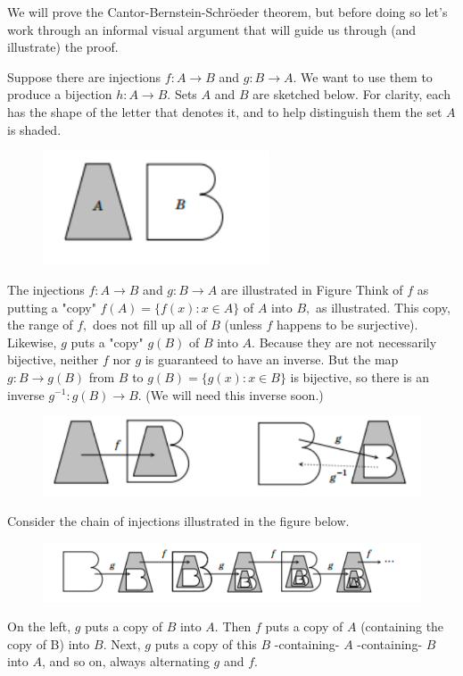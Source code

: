 \documentclass[12pt]{book}
\theoremstyle{definition}\newtheorem{dfn}{Définition}[chapter]
\theoremstyle{plain}\newtheorem{thm}{Théorème}[chapter]
\theoremstyle{plain}\newtheorem{prp}{Proposition}[chapter]
\theoremstyle{plain}\newtheorem{lem}{\bf Lemme}[chapter]
\theoremstyle{plain}\newtheorem{axm}{\bf Axiome}[chapter]
\theoremstyle{plain}\newtheorem{lmm}{\bf Lemme}[chapter]
\theoremstyle{plain}\newtheorem{exm}{\bf Example}[chapter]
\theoremstyle{plain}\newtheorem{cor}{\bf Corollaire}[chapter]
\theoremstyle{remark}\newtheorem{rem}{Remarque}[chapter]
\begin{document}
We will prove the Cantor-Bernstein-Schröeder theorem, but before doing so let's work through an informal visual argument that will guide us through (and illustrate) the proof.

Suppose there are injections $f: A \rightarrow B$ and $g: B
\rightarrow A$. We want to use them to produce a bijection $h: A
\rightarrow B .$ Sets $A$ and $B$ are sketched below. For clarity,
each has the shape of the letter that denotes it, and to help
distinguish them the set $A$ is shaded.
\begin{figure}[H]\centering\includegraphics[width=0.6\textwidth]{image//Vocabulaire de theorie des ensembles//1}\end{figure}
The injections $f: A \rightarrow B$ and $g: B \rightarrow A$ are
illustrated in Figure  Think of $f$ as putting a "copy" $f(A)=\{f(x):
x \in A\}$ of $A$ into $B,$ as illustrated. This copy, the range of
$f,$ does not fill up all of $B$ (unless $f$ happens to be
surjective). Likewise, $g$ puts a "copy" $g(B)$ of $B$ into
$A$. Because they are not necessarily bijective, neither $f$ nor $g$
is guaranteed to have an inverse. But the map $g: B \rightarrow g(B)$
from $B$ to $g(B)=\{g(x): x \in B\}$ is bijective, so there is an
inverse $g^{-1}: g(B) \rightarrow B$. (We will need this inverse
soon.)
\begin{figure}[H]\centering\includegraphics[width=1\textwidth]{image//Vocabulaire de theorie des ensembles//2}\end{figure}
Consider the chain of injections illustrated in the figure below.
\begin{figure}[H]\centering\includegraphics[width=1.2\textwidth]{image//Vocabulaire de theorie des ensembles//3}\end{figure}
 On the left, $g$ puts a copy of $B$ into $A$. Then $f$ puts a copy of $A$ (containing the copy of B) into $B$. Next, $g$ puts a copy of this $B$ -containing- $A$ -containing- $B$ into $A$, and so on, always alternating $g$ and $f$.
\end{document}
